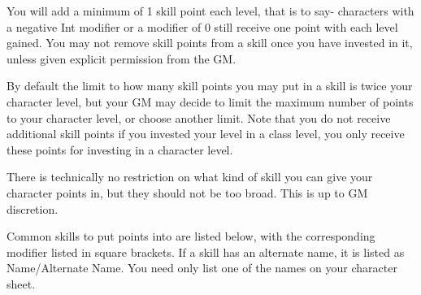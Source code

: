 You will add a minimum of 1 skill point each level, that is to say- characters with a negative Int modifier or a modifier of 0 still receive one point with each level gained. You may not remove skill points from a skill once you have invested in it, unless given explicit permission from the GM.

By default the limit to how many skill points you may put in a skill is twice your character level, but your GM may decide to limit the maximum number of points to your character level, or choose another limit. Note that you do not receive additional skill points if you invested your level in a class level, you only receive these points for investing in a character level.

There is technically no restriction on what kind of skill you can give your character points in, but they should not be too broad. This is up to GM discretion.

Common skills to put points into are listed below, with the corresponding modifier listed in square brackets. If a skill has an alternate name, it is listed as Name/Alternate Name. You need only list one of the names on your character sheet.

